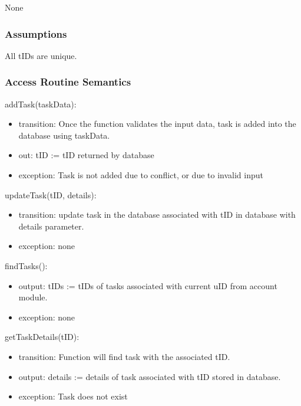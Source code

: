 \documentclass[12pt, titlepage]{article}
\begin{document}
None


\subsubsection{Assumptions}

All tIDs are unique.


\subsubsection{Access Routine Semantics}

\noindent addTask(taskData):
\begin{itemize}
\item transition: Once the function validates the input data, task is added into the database using taskData.
\item out:  tID := tID returned by database
\item exception: Task is not added due to conflict, or due to invalid input
\end{itemize}

\noindent updateTask(tID, details):
\begin{itemize}
\item transition: update task in the database associated with tID in database with details parameter.
\item exception: none
\end{itemize}

\noindent findTasks():
\begin{itemize}
\item output: tIDs := tIDs of tasks associated with current uID from account module.
\item exception: none
\end{itemize}

\noindent getTaskDetails(tID):
\begin{itemize}
\item transition: Function will find task with the associated tID.
\item output: details := details of task associated with tID stored in database.
\item exception: Task does not exist
\end{itemize}
\end{document}

